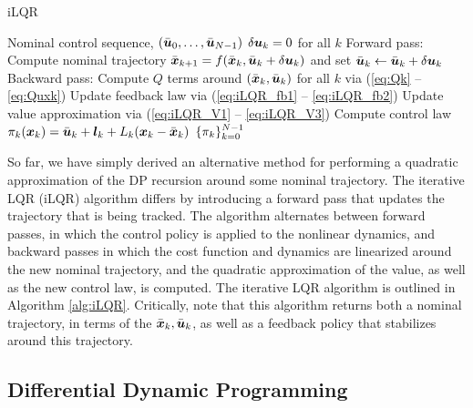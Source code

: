 \begin{algorithm}[t]
\caption{iLQR}
\centering
\label{alg:iLQR}

\begin{algorithmic}[1]
\Require Nominal control sequence, $(\bar{\bm{u}}_0, \ldots, \bar{\bm{u}}_{N-1})$
    \State $\delta \bm{u}_k = 0$ for all $k$ 
    \Statex Forward pass:
    \State Compute nominal trajectory $\bar{\bm{x}}_{k+1} = f(\bar{\bm{x}}_k, \bar{\bm{u}}_k + \delta \bm{u}_k)$ and set $\bar{\bm{u}}_k \gets \bar{\bm{u}}_k + \delta \bm{u}_k$
    \Statex Backward pass:
    \State Compute $Q$ terms around $(\bar{\bm{x}}_k, \bar{\bm{u}}_k)$ for all $k$ via (\ref{eq:Qk} -- \ref{eq:Quxk})
    \State Update feedback law via (\ref{eq:iLQR_fb1} -- \ref{eq:iLQR_fb2})
    \State Update value approximation via (\ref{eq:iLQR_V1} -- \ref{eq:iLQR_V3})
    \EndWhile
    \State Compute control law $\pi_k(\bm{x}_k) = \bar{\bm{u}}_k + \bm{l}_k + L_k(\bm{x}_k - \bar{\bm{x}}_k)$
    \State \Return $\{\pi_k\}_{k=0}^{N-1}$
  \end{algorithmic}
\end{algorithm}

So far, we have simply derived an alternative method for performing a quadratic approximation of the DP recursion around some nominal trajectory. The iterative LQR (iLQR) algorithm differs by introducing a forward pass that updates the trajectory that is being tracked. The algorithm alternates between forward passes, in which the control policy is applied to the nonlinear dynamics, and backward passes in which the cost function and dynamics are linearized around the new nominal trajectory, and the quadratic approximation of the value, as well as the new control law, is computed. The iterative LQR algorithm is outlined in Algorithm \ref{alg:iLQR}. Critically, note that this algorithm returns both a nominal trajectory, in terms of the $\bar{\bm{x}}_k, \bar{\bm{u}}_k$, as well as a feedback policy that stabilizes around this trajectory. 

\subsection{Differential Dynamic Programming}


